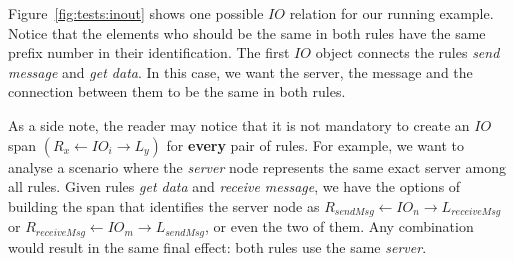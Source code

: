 \begin{example}\label{ex:inout} Figure~\ref{fig:tests:inout} shows one possible $IO$ relation for our running example. Notice that the elements who should be the same in both rules have the same prefix number in their identification. The first $IO$ object connects the rules \emph{send message} and \emph{get data}.  In this case, we want the server, the message and the connection between them to be the same in both rules. %

As a side note, the reader may notice that it is not mandatory to create an $IO$ span \mbox{$\left(R_x \leftarrow IO_i \rightarrow L_y\right)$} for \textbf{every} pair of rules. For example, we want to analyse a scenario where the \emph{server} node represents the same exact server among all rules. Given rules \emph{get data} and \emph{receive message}, we have the options of building the span that identifies the server node as
  $R_{sendMsg} \leftarrow IO_n \rightarrow L_{receiveMsg}$ or $R_{receiveMsg} \leftarrow IO_m \rightarrow L_{sendMsg}$, or even the two of them. Any combination would result in the same final effect: both rules use the same \emph{server}.
  \begin{figure}[!ht]
  \centering

\end{figure}
\end{example}
